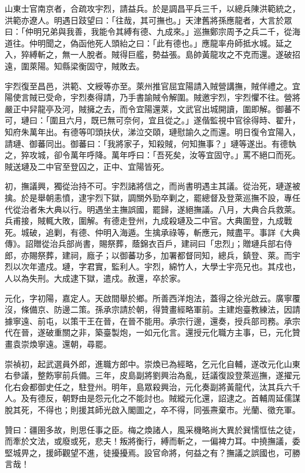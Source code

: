 \begin{pinyinscope}
山東士官南京者，合疏攻宇烈，請益兵。於是調昌平兵三千，以總兵陳洪範統之，洪範亦遼人。明遇日跂望曰：「往哉，其可撫也。」天津舊將孫應龍者，大言於眾曰：「仲明兄弟與我善，我能令其縛有德、九成來。」巡撫鄭宗周予之兵二千，從海道往。仲明聞之，偽函他死人頭紿之曰：「此有德也。」應龍率舟師抵水城。延之入，猝縛斬之，無一人脫者。賊得巨艦，勢益張。島帥黃龍攻之不克而還。遂破招遠，圍萊陽。知縣梁衡固守，賊敗去。

宇烈復至昌邑，洪範、文綬等亦至。萊州推官屈宜陽請入賊營講撫，賊佯禮之。宜陽使言賊已受命，宇烈奏得請，乃手書諭賊令解圍。賊邀宇烈，宇烈懼不往。營將嚴正中舁龍亭及河，賊擁之去，而令宜陽還萊，文武官出城開讀，圍即解。御蕃不可，璉曰：「圍且六月，既已無可奈何，宜且從之。」遂偕監視中官徐得時、翟升，知府朱萬年出。有德等叩頭扶伏，涕泣交頤，璉慰諭久之而還。明日復令宜陽入，請璉、御蕃同出。御蕃曰：「我將家子，知殺賊，何知撫事？」璉等遂出。有德執之，猝攻城，卻令萬年呼降。萬年呼曰：「吾死矣，汝等宜固守。」罵不絕口而死。賊送璉及二中官至登囚之，正中、宜陽皆死。

初，撫議興，獨從治持不可。宇烈諸將信之，而尚書明遇主其議。從治死，璉遂被擒。於是舉朝恚憤，逮宇烈下獄，調關外勁卒剿之，罷總督及登萊巡撫不設，專任代從治者朱大典以行。明遇坐主撫誤國，罷歸，遂絕撫議。八月，大典合兵救萊。兵甫接，賊輒大敗，圍解。有德走登州，九成殺璉及二中官。大典圍登，九成戰死。城破，追剿，有德、仲明入海遁。生擒承祿等，斬應元，賊盡平。事詳《大典傳》。詔贈從治兵部尚書，賜祭葬，蔭錦衣百戶，建祠曰「忠烈」；贈璉兵部右侍郎，亦賜祭葬，建祠，廕子；以御蕃功多，加署都督同知，總兵，鎮登、萊。而宇烈以次年遣戍。璉，字君實，監利人。宇烈，綿竹人，大學士宇亮兄也。其戍也，人以為失刑。大成逮下獄，遣戍。赦還，卒於家。

元化，字初陽，嘉定人。天啟間舉於鄉。所善西洋炮法，蓋得之徐光啟云。廣寧覆沒，條備京、防邊二策。孫承宗請於朝，得贊畫經略軍前。主建炮臺教練法，因請據寧遠、前屯，以策干王在晉，在晉不能用。承宗行邊，還奏，授兵部司務。承宗代在晉，遂破重關之非，築臺製炮，一如元化言。還授元化職方主事，已，元化贊畫袁崇煥寧遠。還朝，尋罷。

崇禎初，起武選員外郎，進職方郎中。崇煥已為經略，乞元化自輔，遂改元化山東右參議，整飭寧前兵備。三年，皮島副將劉興治為亂，廷議復設登萊巡撫，遂擢元化右僉都御史任之，駐登州。明年，島眾殺興治，元化奏副將黃龍代，汰其兵六千人。及有德反，朝野由是怨元化之不能討也。賊縱元化還，詔逮之。首輔周延儒謀脫其死，不得也；則援其師光啟入閣圖之，卒不得，同張燾棄市。光蘭、徵充軍。

贊曰：疆圉多故，則思任事之臣。梅之煥諸人，風采機略尚大異於巽懦恇怯之徒，而牽於文法，或廢或死，悲夫！叛將衡行，縛而斬之，一偏裨力耳。中撓撫議，委堅城畀之，援師觀望不進，徒擾擾焉。設官命將，何益之有？撫議之誤國也，可勝言哉！


\end{pinyinscope}